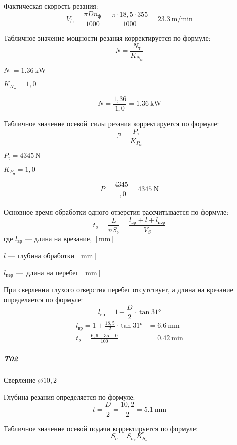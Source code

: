 \documentclass[14pt,russian,a4paper]{extreport}
\begin{document}
Фактическая скорость резания:
$$ V_\text{ф} = \frac{\pi D n_\text{ф}}{1000} = \frac{\pi \cdot 18,5 \cdot 355}{1000} = \SI{23,3}{\meter\per\minute} $$

Табличное значение мощности резания корректируется по формуле:
$$ N = \frac{N_\text{т}}{K_{N_\text{м}}} $$

$ N_\text{t} = \SI{1,36}{\kilo\watt} $ \cite[карта 46]{guzeev:rr} \par
$ K_{N_\text{м}} = 1,0 $ \cite[карта 53]{guzeev:rr}

$$ N = \frac{1,36}{1,0} = \SI{1,36}{\kilo\watt} $$

Табличное значение осевой силы резания корректируется по формуле:
$$ P = \frac{P_\text{т}}{K_{P_\text{м}}} $$

$ P_\text{t} = \SI{4345}{\newton} $ \cite[карта 46]{guzeev:rr} \par
$ K_{P_\text{м}} = 1,0 $ \cite[карта 53]{guzeev:rr}

$$ P = \frac{4345}{1,0} = \SI{4345}{\newton} $$ \\

Основное время обработки одного отверстия рассчитывается по формуле:
\begin{equation*}
  t_o = \frac{L}{n S_o} = \frac{l_\text{вр} + l + l_\text{пер}}{V_S}
\end{equation*}
где $l_\text{вр}$ --- длина на врезание, $\left[\si{\milli\meter}\right]$ \par
$l$ --- глубина обработки $\left[\si{\milli\meter}\right]$ \par
$l_\text{пер}$ --- длина на перебег $\left[\si{\milli\meter}\right]$

При сверлении глухого отверстия перебег отсутствует, а длина на врезание определяется по формуле:
\begin{equation*}
  l_\text{вр} = 1 + \frac{D}{2} \cdot \tan{\ang{31}}
\end{equation*}
\begin{align*}
    l_\text{вр} = 1 + \frac{18,5}{2} \cdot \tan{\ang{31}} &= \SI{6,6}{\milli\meter} \\
    t_o = \frac{6,6 + 35 + 0}{100} &= \SI{0,42}{\minute}
\end{align*}


\subparagraph{T02} Сверление $\diameter 10,2$ \

Глубина резания определяется по формуле:
$$ t = \frac{D}{2} = \frac{10,2}{2} = \SI{5,1}{\milli\meter} $$

Табличное значение осевой подачи корректируется по формуле:
$$ S_o = {S_o}_\text{т} K_{S_\text{м}} $$
\end{document}
